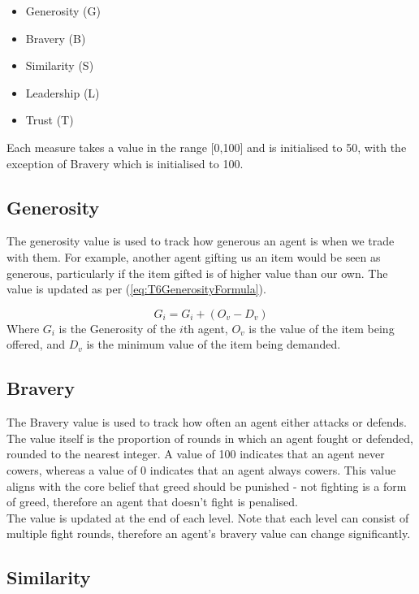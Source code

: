 \begin{itemize}
    \item Generosity (G)
    \item Bravery (B)
    \item Similarity (S)
    \item Leadership (L)
    \item Trust (T)
\end{itemize}

Each measure takes a value in the range [0,100] and is initialised to 50, with the exception of Bravery which is initialised to 100.

\subsection{Generosity}

The generosity value is used to track how generous an agent is when we trade with them. For example, another agent gifting us an item would be seen as generous, particularly if the item gifted is of higher value than our own. The value is updated as per (\ref{eq:T6GenerosityFormula}).

\begin{equation}\label{eq:T6GenerosityFormula}
    G_{i} = G_{i} + (O_{v} - D_{v})
\end{equation}
Where $G_{i}$ is the Generosity of the $i$th agent, $O_{v}$ is the value of the item being offered, and $D_{v}$ is the minimum value of the item being demanded.

\subsection{Bravery}

The Bravery value is used to track how often an agent either attacks or defends. The value itself is the proportion of rounds in which an agent fought or defended, rounded to the nearest integer. A value of 100 indicates that an agent never cowers, whereas a value of 0 indicates that an agent always cowers. This value aligns with the core belief that greed should be punished - not fighting is a form of greed, therefore an agent that doesn't fight is penalised.\\

The value is updated at the end of each level. Note that each level can consist of multiple fight rounds, therefore an agent's bravery value can change significantly.

\subsection{Similarity}

